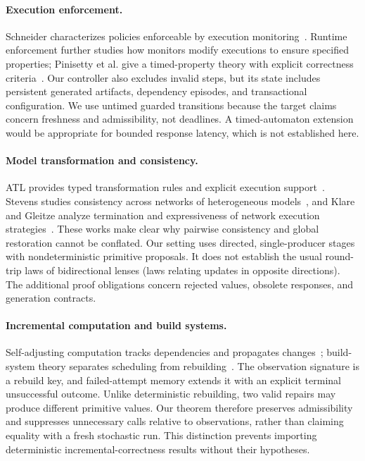 \documentclass[pdflatex,sn-mathphys-num]{sn-jnl}
\theoremstyle{thmstyleone}
\theoremstyle{thmstylethree}
\theoremstyle{thmstyletwo}
\begin{document}
\paragraph{Execution enforcement.} Schneider characterizes policies enforceable by execution monitoring~\cite{schneider}. Runtime enforcement further studies how monitors modify executions to ensure specified properties; Pinisetty et al. give a timed-property theory with explicit correctness criteria~\cite{pinisetty}. Our controller also excludes invalid steps, but its state includes persistent generated artifacts, dependency episodes, and transactional configuration. We use untimed guarded transitions because the target claims concern freshness and admissibility, not deadlines. A timed-automaton extension would be appropriate for bounded response latency, which is not established here.

\paragraph{Model transformation and consistency.} ATL provides typed transformation rules and explicit execution support~\cite{atl}. Stevens studies consistency across networks of heterogeneous models~\cite{stevens}, and Klare and Gleitze analyze termination and expressiveness of network execution strategies~\cite{klare}. These works make clear why pairwise consistency and global restoration cannot be conflated. Our setting uses directed, single-producer stages with nondeterministic primitive proposals. It does not establish the usual round-trip laws of bidirectional lenses (laws relating updates in opposite directions). The additional proof obligations concern rejected values, obsolete responses, and generation contracts.

\paragraph{Incremental computation and build systems.} Self-adjusting computation tracks dependencies and propagates changes~\cite{acar}; build-system theory separates scheduling from rebuilding~\cite{mokhov}. The observation signature is a rebuild key, and failed-attempt memory extends it with an explicit terminal unsuccessful outcome. Unlike deterministic rebuilding, two valid repairs may produce different primitive values. Our theorem therefore preserves admissibility and suppresses unnecessary calls relative to observations, rather than claiming equality with a fresh stochastic run. This distinction prevents importing deterministic incremental-correctness results without their hypotheses.
\end{document}
